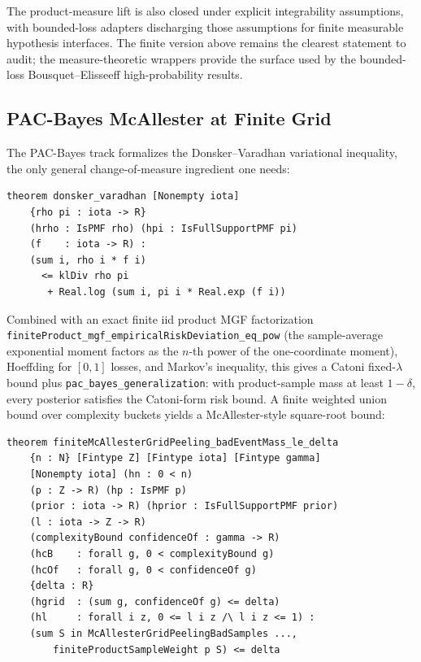 \documentclass[10pt,twocolumn,letterpaper]{article}
\begin{document}
The product-measure lift is also closed under explicit integrability
assumptions, with bounded-loss adapters discharging those assumptions for
finite measurable hypothesis interfaces. The finite version above remains the
clearest statement to audit; the measure-theoretic wrappers provide the
surface used by the bounded-loss Bousquet--Elisseeff high-probability results.

\subsection{PAC-Bayes McAllester at Finite Grid}
\label{sec:pacbayes}

The PAC-Bayes track formalizes the Donsker--Varadhan variational
inequality, the only general change-of-measure ingredient one needs:

\begin{lstlisting}[caption={Donsker--Varadhan variational inequality
                  (\texttt{FormalSLT/PACBayesKL.lean:235}).},
                  label={lst:dv}]
theorem donsker_varadhan [Nonempty iota]
    {rho pi : iota -> R}
    (hrho : IsPMF rho) (hpi : IsFullSupportPMF pi)
    (f    : iota -> R) :
    (sum i, rho i * f i)
      <= klDiv rho pi
       + Real.log (sum i, pi i * Real.exp (f i))
\end{lstlisting}

\noindent
Combined with an exact finite iid product MGF factorization
\texttt{finiteProduct\_mgf\_empiricalRiskDeviation\_eq\_pow} (the
sample-average exponential moment factors as the $n$-th power of the
one-coordinate moment), Hoeffding for $[0,1]$ losses, and Markov's inequality,
this gives a Catoni fixed-$\lambda$ bound plus
\texttt{pac\_bayes\_generalization}: with product-sample mass at least
$1-\delta$, every posterior satisfies the Catoni-form risk bound. A finite
weighted union bound over complexity buckets yields a McAllester-style
square-root bound:

\begin{lstlisting}[caption={Finite-grid McAllester PAC-Bayes confidence
                  bound (\texttt{FormalSLT/PACBayesBoundedLoss.lean:766}).},
                  label={lst:mca}]
theorem finiteMcAllesterGridPeeling_badEventMass_le_delta
    {n : N} [Fintype Z] [Fintype iota] [Fintype gamma]
    [Nonempty iota] (hn : 0 < n)
    (p : Z -> R) (hp : IsPMF p)
    (prior : iota -> R) (hprior : IsFullSupportPMF prior)
    (l : iota -> Z -> R)
    (complexityBound confidenceOf : gamma -> R)
    (hcB    : forall g, 0 < complexityBound g)
    (hcOf   : forall g, 0 < confidenceOf g)
    {delta : R}
    (hgrid  : (sum g, confidenceOf g) <= delta)
    (hl     : forall i z, 0 <= l i z /\ l i z <= 1) :
    (sum S in McAllesterGridPeelingBadSamples ...,
        finiteProductSampleWeight p S) <= delta
\end{lstlisting}
\end{document}
